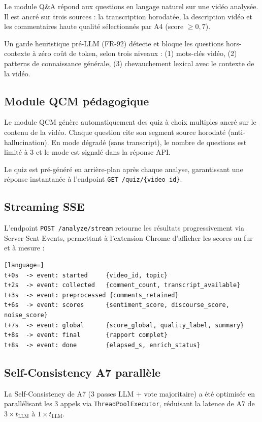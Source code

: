 \documentclass[12pt, a4paper]{article}
\begin{document}
Le module Q\&A répond aux questions en langage naturel sur une vidéo analysée.
Il est ancré sur trois sources : la transcription horodatée, la description
vidéo et les commentaires haute qualité sélectionnés par A4 (score $\geq 0{,}7$).

Un garde heuristique pré-LLM (FR-92) détecte et bloque les questions hors-contexte
à zéro coût de token, selon trois niveaux :
(1) mots-clés vidéo, (2) patterns de connaissance générale, (3) chevauchement
lexical avec le contexte de la vidéo.

\subsection{Module QCM pédagogique}

Le module QCM génère automatiquement des quiz à choix multiples ancré sur le
contenu de la vidéo. Chaque question cite son segment source horodaté
(anti-hallucination). En mode dégradé (sans transcript), le nombre de questions
est limité à 3 et le mode est signalé dans la réponse API.

Le quiz est pré-généré en arrière-plan après chaque analyse, garantissant
une réponse instantanée à l'endpoint \texttt{GET /quiz/\{video\_id\}}.

\subsection{Streaming SSE}

L'endpoint \texttt{POST /analyze/stream} retourne les résultats progressivement
via Server-Sent Events, permettant à l'extension Chrome d'afficher les scores
au fur et à mesure :

\begin{lstlisting}[language=]
t+0s  -> event: started     {video_id, topic}
t+2s  -> event: collected   {comment_count, transcript_available}
t+3s  -> event: preprocessed {comments_retained}
t+6s  -> event: scores      {sentiment_score, discourse_score, noise_score}
t+7s  -> event: global      {score_global, quality_label, summary}
t+8s  -> event: final       {rapport complet}
t+8s  -> event: done        {elapsed_s, enrich_status}
\end{lstlisting}

\subsection{Self-Consistency A7 parallèle}

La Self-Consistency de A7 (3 passes LLM + vote majoritaire) a été optimisée
en parallélisant les 3 appels via \texttt{ThreadPoolExecutor}, réduisant la
latence de A7 de $3 \times t_{\text{LLM}}$ à $1 \times t_{\text{LLM}}$.
\end{document}
